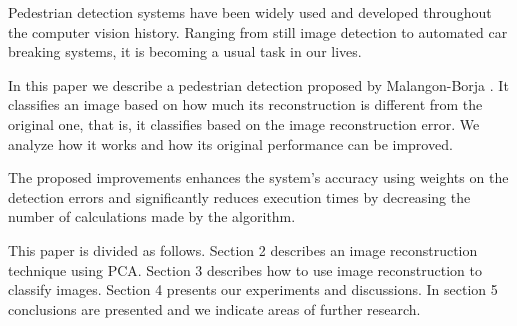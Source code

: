 \documentclass[10pt, conference, compsocconf]{IEEEtran}
\begin{document}


Pedestrian detection systems have been widely used and developed throughout the computer vision history. Ranging from still image detection to automated car breaking systems, it is becoming a usual task in our lives.

In this paper we describe a pedestrian detection proposed by Malangon-Borja \cite{borja09}. It classifies an image based on how much its reconstruction is different from the original one, that is, it classifies based on the image reconstruction error. We analyze how it works and how its original performance can be improved.

The proposed improvements enhances the system's accuracy using weights on the detection errors and significantly reduces execution times by decreasing the number of calculations made by the algorithm.


This paper is divided as follows. Section 2 describes an image reconstruction technique using PCA. Section 3 describes how to use image reconstruction to classify images. Section 4 presents our experiments and discussions. In section 5 conclusions are presented and we indicate areas of further research.
\end{document}
